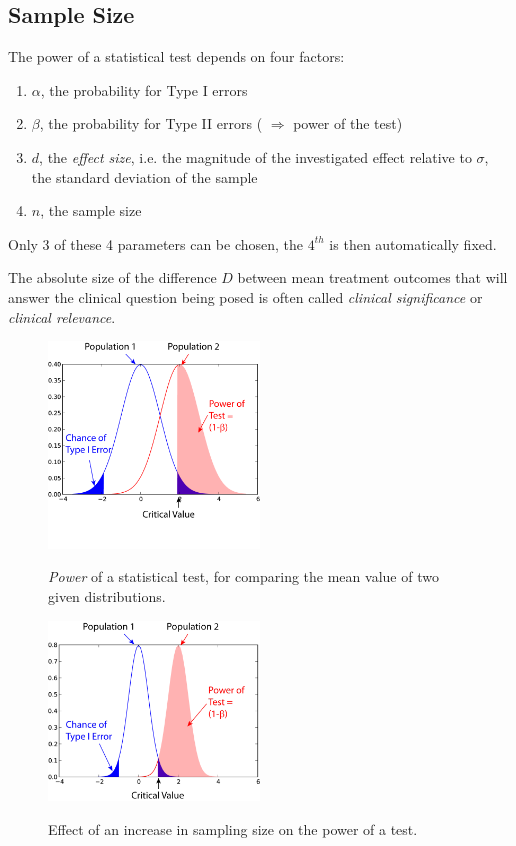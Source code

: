 \subsection{Sample Size}
The power of a statistical test depends on four factors:

\begin{enumerate}
  \item  $\alpha$, the probability for Type I errors
  \item  $\beta$, the probability for Type II errors ( $\Rightarrow$ power of the test)
  \item  $d$, the \emph{effect size}, i.e. the magnitude of the investigated effect relative to $\sigma$, the standard deviation of the sample
  \item  $n$, the sample size
\end{enumerate}

Only 3 of these 4 parameters can be chosen, the $4^{th}$ is then automatically fixed.

The absolute size of the difference $D$ between mean treatment outcomes that will answer the clinical question being posed is often called \emph{clinical significance} or \emph{clinical relevance}.

\begin{figure}[!ht]
  \centering
  \includegraphics[width=0.5\textwidth]{../Images/power1.png}\\
  \caption{\emph{Power} of a statistical test, for comparing the mean value of two given distributions.}\label{fig:power1}
\end{figure}

\begin{figure}[!ht]
  \centering
  \includegraphics[width=0.5\textwidth]{../Images/power2.png}\\
  \caption{Effect of an increase in sampling size on the power of a test.}\label{fig:power2}
\end{figure}

